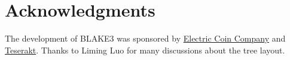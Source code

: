 \documentclass[11pt,notitlepage,a4paper]{article}
\begin{document}
\section*{Acknowledgments}\label{sec:acknowledgments}

The development of BLAKE3 was sponsored by
\href{https://electriccoin.co/}{Electric Coin Company} and
\href{https://teserakt.io}{Teserakt}. Thanks to Liming Luo for many discussions
about the tree layout.



\end{document}
